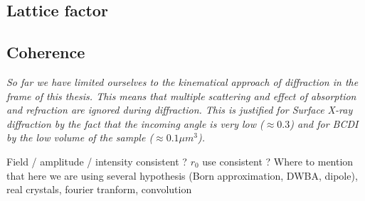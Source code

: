 \subsection{Lattice factor}


\subsection{Coherence}


\textit{
So far we have limited ourselves to the kinematical approach of diffraction in the frame of this thesis.
This means that multiple scattering and effect of absorption and refraction are ignored during diffraction.
This is justified for Surface X-ray diffraction by the fact that the incoming angle is very low ($\approx 0.3$) and for BCDI by the low volume of the sample ($\approx 0.1 \mu m^3$).
}

\textcolor{Important}{Field / amplitude / intensity consistent ? $r_0$ use consistent ? Where to mention that here we are using several hypothesis (Born approximation, DWBA, dipole), real crystals, fourier tranform, convolution}


